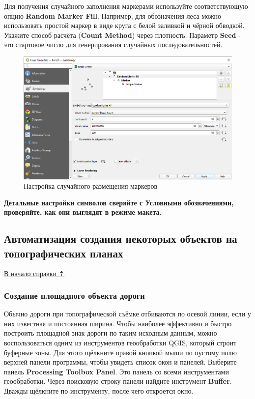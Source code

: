 \documentclass[
  12pt,
]{book}
\begin{document}
Для получения случайного заполнения маркерами используйте соответствующую опцию \textbf{Random Marker Fill}. Например, для обозначения леса можно использовать простой маркер в виде круга с белой заливкой и чёрной обводкой. Укажите способ расчёта (\textbf{Count Method}) через плотность. Параметр \textbf{Seed} - это стартовое число для генерирования случайных последовательностей.

\begin{figure}
\centering
\includegraphics{images/Practice/Randomized_fill.png}
\caption{Настройка случайного размещения маркеров}
\end{figure}

\textbf{Детальные настройки символов сверяйте с Условными обозначениями, проверяйте, как они выглядят в режиме макета.}

\subsection{Автоматизация создания некоторых объектов на топографических планах}\label{practice-topo-tips_tricks}

\hyperref[practice-topo]{В начало справки ⇡}

\subsubsection{Создание площадного объекта дороги}\label{practice-topo-tips_tricks-roads}

Обычно дороги при топографической съёмке отбиваются по осевой линии, если у них известная и постоянная ширина. Чтобы наиболее эффективно и быстро построить площадной знак дороги по таким исходным данным, можно воспользоваться одним из инструментов геообработки QGIS, который строит буферные зоны. Для этого щёлкните правой кнопкой мыши по пустому полю верхней панели программы, чтобы увидеть список окон и панелей. Выберите панель \textbf{Processing Toolbox Panel}. Это панель со всеми инструментами геообработки. Через поисковую строку панели найдите инструмент \textbf{Buffer}. Дважды щёлкните по инструменту, после чего откроется окно.
\end{document}
